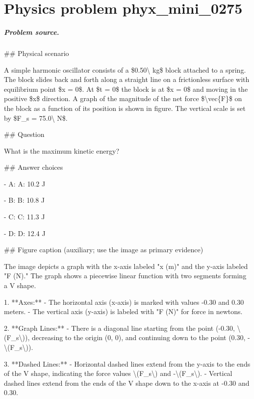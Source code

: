 
\chapter{Physics problem phyx\_mini\_0275}
\label{ch:PhyXMiniProblems_problem_phyx_mini_0275}

\paragraph{Problem source.}
\#\# Physical scenario

A simple harmonic oscillator consists of a \$0.50\textbackslash{} kg\$ block attached to a spring. The block slides back and forth along a straight line on a frictionless surface with equilibrium point \$x = 0\$. At \$t = 0\$ the block is at \$x = 0\$ and moving in the positive \$x\$ direction. A graph of the magnitude of the net force \$\textbackslash{}vec\{F\}\$ on the block as a function of its position is shown in figure. The vertical scale is set by \$F\_s = 75.0\textbackslash{} N\$.

\#\# Question

What is the maximum kinetic energy?

\#\# Answer choices

- A: A: 10.2 J

- B: B: 10.8 J

- C: C: 11.3 J

- D: D: 12.4 J

\#\# Figure caption (auxiliary; use the image as primary evidence)

The image depicts a graph with the x-axis labeled "x (m)" and the y-axis labeled "F (N)." The graph shows a piecewise linear function with two segments forming a V shape.

1. **Axes:**
   - The horizontal axis (x-axis) is marked with values -0.30 and 0.30 meters.
   - The vertical axis (y-axis) is labeled with "F (N)" for force in newtons.

2. **Graph Lines:**
   - There is a diagonal line starting from the point (-0.30, \textbackslash{}(F\_s\textbackslash{})), decreasing to the origin (0, 0), and continuing down to the point (0.30, -\textbackslash{}(F\_s\textbackslash{})).

3. **Dashed Lines:**
   - Horizontal dashed lines extend from the y-axis to the ends of the V shape, indicating the force values \textbackslash{}(F\_s\textbackslash{}) and -\textbackslash{}(F\_s\textbackslash{}).
   - Vertical dashed lines extend from the ends of the V shape down to the x-axis at -0.30 and 0.30.


